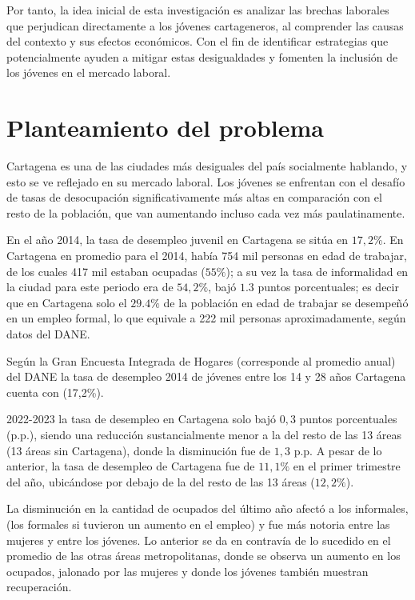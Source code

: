 \documentclass[letterpaper, 12pt]{article}
\begin{document}
Por tanto, la idea inicial de esta investigación es analizar las brechas
laborales que perjudican directamente a los jóvenes cartageneros, al 
comprender las causas del contexto y sus efectos económicos. Con el fin de 
identificar estrategias que potencialmente ayuden a mitigar estas 
desigualdades y fomenten la inclusión de los jóvenes en el mercado laboral. 

\section{Planteamiento del problema}

Cartagena es una de las ciudades más desiguales del país socialmente 
hablando, y esto se ve reflejado en su mercado laboral. Los jóvenes se 
enfrentan con el desafío de tasas de desocupación significativamente más
altas en comparación con el resto de la población, que van aumentando 
incluso cada vez más paulatinamente.  

En el año 2014, la tasa de desempleo juvenil en Cartagena se sitúa 
en $17,2\%$. En Cartagena en promedio para el 2014, había 754 mil 
personas en edad de trabajar, de los cuales 417 mil estaban ocupadas 
($55\%$); a su vez la tasa de informalidad en la ciudad para este periodo 
era de $54,2\%$, bajó $1.3$ puntos porcentuales; es decir que en 
Cartagena solo el $29.4\%$ de la población en edad de trabajar se 
desempeñó en un empleo formal, lo que equivale a 222 mil personas 
aproximadamente, según datos del DANE.

Según la Gran Encuesta Integrada de Hogares (corresponde al promedio anual)
del DANE la tasa de desempleo 2014 de jóvenes entre los 14 y 28 años
Cartagena cuenta con (17,2\%).

2022-2023 la tasa de desempleo en Cartagena solo bajó $0,3$ puntos 
porcentuales (p.p.), siendo una reducción sustancialmente menor a la del 
resto de las 13 áreas (13 áreas sin Cartagena), donde la disminución fue de
$1,3$ p.p. A pesar de lo anterior, la tasa de desempleo de Cartagena fue de
$11,1\%$ en el primer trimestre del año, ubicándose por debajo de la del
resto de las 13 áreas ($12,2\%$). 


La disminución en la cantidad de ocupados del último año afectó a los
informales, (los formales si tuvieron un aumento en el empleo) y fue más 
notoria entre las mujeres y entre los jóvenes. Lo anterior se da en contravía
de lo sucedido en el promedio de las otras áreas metropolitanas, donde se 
observa un aumento en los ocupados, jalonado por las mujeres y donde los 
jóvenes también muestran recuperación.
\end{document}
